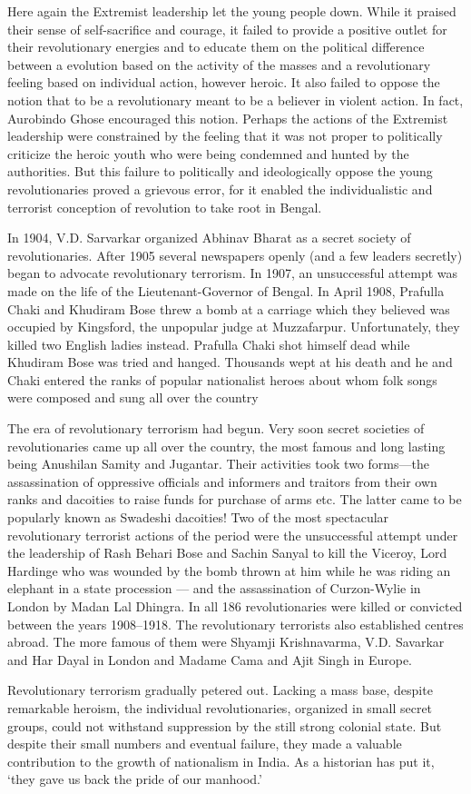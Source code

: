 Here again the Extremist leadership let the young people down. While it praised their sense of self-sacrifice and courage, it failed to provide a positive outlet for their revolutionary energies and to educate them on the political difference between a evolution based on the activity of the masses and a revolutionary feeling based on individual action, however heroic. It also failed to oppose the notion that to be a revolutionary meant to be a believer in violent action. In fact, Aurobindo Ghose encouraged this notion. Perhaps the actions of the Extremist leadership were constrained by the feeling that it was not proper to politically criticize the heroic youth who were being condemned and hunted by the authorities. But this failure to politically and ideologically oppose the young revolutionaries proved a grievous error, for it enabled the individualistic and terrorist conception of revolution to take root in Bengal.

In 1904, V.D. Sarvarkar organized Abhinav Bharat as a secret society of revolutionaries. After 1905 several newspapers openly (and a few leaders secretly) began to advocate revolutionary terrorism. In 1907, an unsuccessful attempt was made on the life of the Lieutenant-Governor of Bengal. In April 1908, Prafulla Chaki and Khudiram Bose threw a bomb at a carriage which they believed was occupied by Kingsford, the unpopular judge at Muzzafarpur. Unfortunately, they killed two English ladies instead. Prafulla Chaki shot himself dead while Khudiram Bose was tried and hanged. Thousands wept at his death and he and Chaki entered the ranks of popular nationalist heroes about whom folk songs were composed and sung all over the country

The era of revolutionary terrorism had begun. Very soon secret societies of revolutionaries came up all over the country, the most famous and long lasting being Anushilan Samity and Jugantar. Their activities took two forms---the assassination of oppressive officials and informers and traitors from their own ranks and dacoities to raise funds for purchase of arms etc. The latter came to be popularly known as Swadeshi dacoities! Two of the most spectacular revolutionary terrorist actions of the period were the unsuccessful attempt under the leadership of Rash Behari Bose and Sachin Sanyal to kill the Viceroy, Lord Hardinge who was wounded by the bomb thrown at him while he was riding an elephant in a state procession --- and the assassination of Curzon-Wylie in London by Madan Lal Dhingra. In all 186 revolutionaries were killed or convicted between the years 1908--1918. The revolutionary terrorists also established centres abroad. The more famous of them were Shyamji Krishnavarma, V.D. Savarkar and Har Dayal in London and Madame Cama and Ajit Singh in Europe.

Revolutionary terrorism gradually petered out. Lacking a mass base, despite remarkable heroism, the individual revolutionaries, organized in small secret groups, could not withstand suppression by the still strong colonial state. But despite their small numbers and eventual failure, they made a valuable contribution to the growth of nationalism in India. As a historian has put it, `they gave us back the pride of our manhood.'
